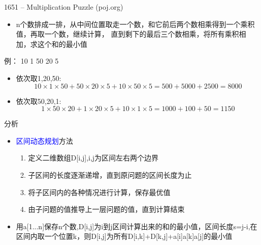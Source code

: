 \begin{frame}{1651 -- Multiplication Puzzle (poj.org)}
    \begin{itemize}
        \item n个数排成一排，从中间位置取走一个数，和它前后两个数相乘得到一个乘积值，再取一个数，继续计算， 直到剩下的最后三个数相乘，将所有乘积相加，求这个和的最小值
    \end{itemize}
    \vfill
    \begin{exampleblock}{例： 10 1 50 20 5}
        \begin{itemize}
            \item 依次取1,20,50:
            $$10\times 1\times 50+50\times 20\times 5+10\times 50\times 5=500+5000+2500=8000$$
            \item 依次取50,20,1:
            $$1\times 50\times 20+1\times 20\times 5+10\times 1\times 5=1000+100+50=1150$$
        \end{itemize}
    \end{exampleblock}
\end{frame}
\begin{frame}{分析}
    \begin{itemize}
        \item \textcolor{blue}{区间动态规划}方法
        \begin{enumerate}[(1)]
            \item 定义二维数组D[i,j],i,j为区间左右两个边界
            \item 子区间的长度逐渐递增，直到原问题的区间长度为止
            \item 将子区间内的各种情况进行计算，保存最优值
            \item 由子问题的值推导上一层问题的值，直到计算结束
        \end{enumerate}
        \vfill
        \item 用a[1...n]保存n个数,D[i,j]为i到j区间计算出来的和的最小值，区间长度s=j-i,在区间内取一个位置k，则D[i,j]为所有D[i,k]+D[k,j]+a[i]\times a[k]\times a[j]的最小值
    \end{itemize}
\end{frame}
